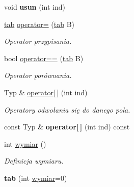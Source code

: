 \begin{DoxyCompactItemize}
\item 
\hypertarget{classtab_a2bf843dc30ad51922a85f676f978dd47}{void {\bfseries usun} (int ind)}\label{classtab_a2bf843dc30ad51922a85f676f978dd47}

\item 
\hypertarget{classtab_af186c24050e089bb140bc2980bab8448}{\hyperlink{classtab}{tab} \hyperlink{classtab_af186c24050e089bb140bc2980bab8448}{operator=} (\hyperlink{classtab}{tab} \-B)}\label{classtab_af186c24050e089bb140bc2980bab8448}

\begin{DoxyCompactList}\small\item\em \-Operator przypisania. \end{DoxyCompactList}\item 
\hypertarget{classtab_a2729682ece1734772085a32ab2a992e5}{bool \hyperlink{classtab_a2729682ece1734772085a32ab2a992e5}{operator==} (\hyperlink{classtab}{tab} \-B)}\label{classtab_a2729682ece1734772085a32ab2a992e5}

\begin{DoxyCompactList}\small\item\em \-Operator porównania. \end{DoxyCompactList}\item 
\hypertarget{classtab_a85ddf1710645b9e1ffd36726830a581b}{\-Typ \& \hyperlink{classtab_a85ddf1710645b9e1ffd36726830a581b}{operator\mbox{[}$\,$\mbox{]}} (int ind)}\label{classtab_a85ddf1710645b9e1ffd36726830a581b}

\begin{DoxyCompactList}\small\item\em \-Operatory odwołania się do danego pola. \end{DoxyCompactList}\item 
\hypertarget{classtab_a7896ca836d17e0636804124889c742dc}{const \-Typ \& {\bfseries operator\mbox{[}$\,$\mbox{]}} (int ind) const }\label{classtab_a7896ca836d17e0636804124889c742dc}

\item 
\hypertarget{classtab_aedffa47955ffaea9876790a5fdbd9562}{int \hyperlink{classtab_aedffa47955ffaea9876790a5fdbd9562}{wymiar} ()}\label{classtab_aedffa47955ffaea9876790a5fdbd9562}

\begin{DoxyCompactList}\small\item\em \-Definicja wymiaru. \end{DoxyCompactList}\item 
\hypertarget{classtab_a36068a968872b0263096a9719a2ad5bb}{{\bfseries tab} (int \hyperlink{classtab_aedffa47955ffaea9876790a5fdbd9562}{wymiar}=0)}\label{classtab_a36068a968872b0263096a9719a2ad5bb}


\end{DoxyCompactItemize}
